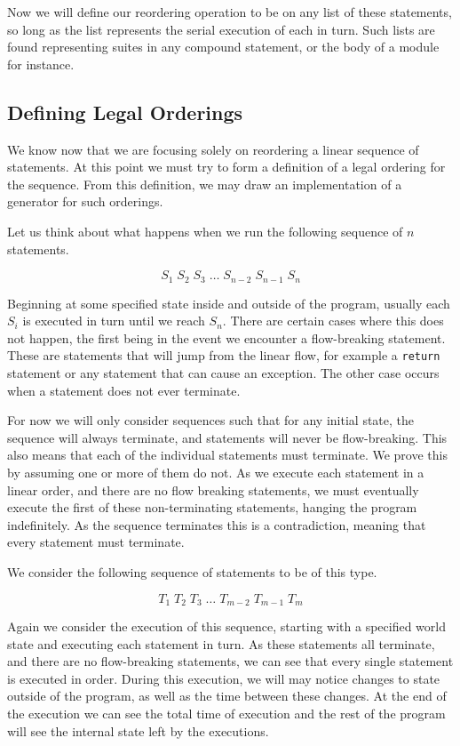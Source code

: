 \documentclass{report}
\begin{document}
Now we will define our reordering operation to be on any list of these statements, so long as the list represents the serial execution of each in turn.
Such lists are found representing suites in any compound statement, or the body of a module for instance.

\subsection{Defining Legal Orderings}

We know now that we are focusing solely on reordering a linear sequence of statements. At this point we must try to form a definition of a legal ordering
for the sequence. From this definition, we may draw an implementation of a generator for such orderings.

Let us think about what happens when we run the following sequence of $n$ statements.

$$S_1 \; S_2 \; S_3 \; \ldots \; S_{n-2} \; S_{n-1} \; S_n$$

Beginning at some specified state inside and outside of the program, usually each $S_i$ is executed in turn until we reach $S_n$. There are certain cases where
this does not happen, the first being in the event we encounter a flow-breaking statement. These are statements that will jump from the linear flow, for
example a \texttt{return} statement or any statement that can cause an exception. The other case occurs when a statement does not ever terminate.

For now we will only consider sequences such that for any initial state, the sequence will always terminate, and statements will never be flow-breaking. This also
means that each of the individual statements must terminate. We prove this by assuming one or more of them do not. As we execute each statement in a linear
order, and there are no flow breaking statements, we must eventually execute the first of these non-terminating statements, hanging the program indefinitely.
As the sequence terminates this is a contradiction, meaning that every statement must terminate.

We consider the following sequence of statements to be of this type.

$$T_1 \; T_2 \; T_3 \; \ldots \; T_{m-2} \; T_{m-1} \; T_m$$

Again we consider the execution of this sequence, starting with a specified world state and executing each statement in turn. As these statements all terminate,
and there are no flow-breaking statements, we can see that every single statement is executed in order. During this execution, we will may notice changes to state
outside of the program, as well as the time between these changes. At the end of the execution we can see the total time of execution and the rest of the program
will see the internal state left by the executions.
\end{document}
